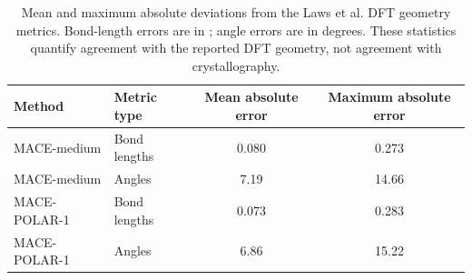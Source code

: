 \documentclass[11pt]{article}
\begin{document}
\begin{table}[htbp]
\centering
\caption{Mean and maximum absolute deviations from the Laws et al. DFT
geometry metrics. Bond-length errors are in \si{\text{\AA}}; angle errors are
in degrees. These statistics quantify agreement with the reported DFT
geometry, not agreement with crystallography.}
\label{tab:mace_geometry_error_summary}
\begin{tabular}{llcc}
\toprule
Method & Metric type & Mean absolute error & Maximum absolute error \\
\midrule
MACE-medium & Bond lengths & 0.080 & 0.273 \\
MACE-medium & Angles & 7.19 & 14.66 \\
MACE-POLAR-1 & Bond lengths & 0.073 & 0.283 \\
MACE-POLAR-1 & Angles & 6.86 & 15.22 \\
\bottomrule
\end{tabular}
\end{table}
\end{document}
